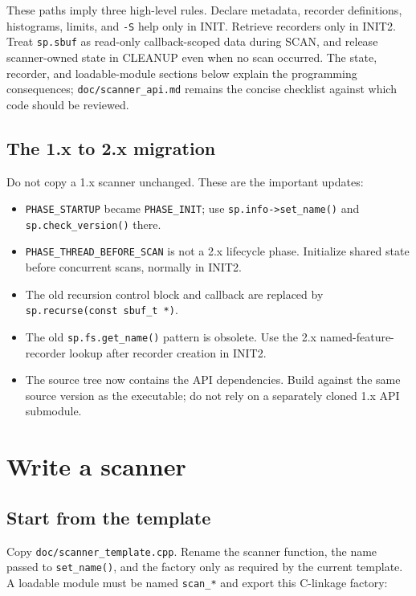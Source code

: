 \documentclass[11pt]{article}
\newcommand{\code}[1]{\texttt{#1}}
\begin{document}
\FloatBarrier

These paths imply three high-level rules. Declare metadata, recorder
definitions, histograms, limits, and \code{-S} help only in INIT. Retrieve
recorders only in INIT2. Treat \code{sp.sbuf} as read-only callback-scoped data
during SCAN, and release scanner-owned state in CLEANUP even when no scan
occurred. The state, recorder, and loadable-module sections below explain the
programming consequences; \code{doc/scanner\_api.md} remains the concise
checklist against which code should be reviewed.

\subsection{The 1.x to 2.x migration}

Do not copy a 1.x scanner unchanged. These are the important updates:

\begin{itemize}
\item \code{PHASE\_STARTUP} became \code{PHASE\_INIT}; use
  \code{sp.info->set\_name()} and \code{sp.check\_version()} there.
\item \code{PHASE\_THREAD\_BEFORE\_SCAN} is not a 2.x lifecycle phase.
  Initialize shared state before concurrent scans, normally in INIT2.
\item The old recursion control block and callback are replaced by
  \code{sp.recurse(const sbuf\_t *)}.
\item The old \code{sp.fs.get\_name()} pattern is obsolete. Use the 2.x
  named-feature-recorder lookup after recorder creation in INIT2.
\item The source tree now contains the API dependencies. Build against the
  same source version as the executable; do not rely on a separately cloned
  1.x API submodule.
\end{itemize}

\section{Write a scanner}

\subsection{Start from the template}

Copy \code{doc/scanner\_template.cpp}. Rename the scanner function, the name
passed to \code{set\_name()}, and the factory only as required by the current
template. A loadable module must be named \code{scan\_*} and export this
C-linkage factory:
\end{document}
